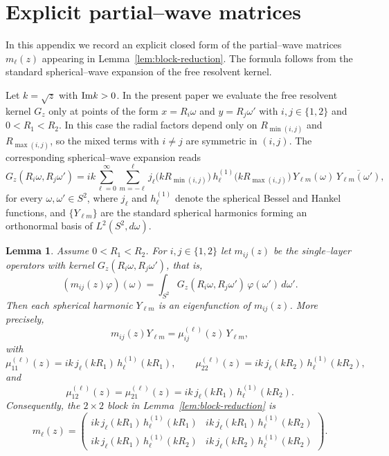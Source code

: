 \documentclass[a4paper,11pt]{article}
\numberwithin{equation}{section}
\renewcommand{\Im}{\text{{\rm Im}}}
\newtheorem{lem}[thm]{Lemma}
\theoremstyle{definition}
\theoremstyle{remark}
\begin{document}
\section{Explicit partial--wave matrices}\label{app:ml}

In this appendix we record an explicit closed form of the partial--wave matrices
$m_\ell(z)$ appearing in Lemma~\ref{lem:block-reduction}.
The formula follows from the standard spherical--wave expansion of the free
resolvent kernel.

Let $k=\sqrt z$ with $\Im k>0$.
In the present paper we evaluate the free resolvent kernel $G_z$ only at points
of the form $x=R_i\omega$ and $y=R_j\omega'$ with $i,j\in\{1,2\}$ and
$0<R_1<R_2$.
In this case the radial factors depend only on $R_{\min(i,j)}$ and
$R_{\max(i,j)}$, so the mixed terms with $i\ne j$ are symmetric in $(i,j)$.
The corresponding spherical--wave expansion reads
$$
G_z(R_i\omega,R_j\omega')
=
ik\sum_{\ell=0}^\infty\sum_{m=-\ell}^{\ell}
j_\ell\bigl(kR_{\min(i,j)}\bigr)\,
h^{(1)}_\ell\bigl(kR_{\max(i,j)}\bigr)\,
Y_{\ell m}(\omega)\,\overline{Y_{\ell m}(\omega')},
$$
for every $\omega,\omega'\in S^2$,
where $j_\ell$ and $h^{(1)}_\ell$ denote the spherical Bessel and Hankel
functions, and $\{Y_{\ell m}\}$ are the standard spherical harmonics forming
an orthonormal basis of $L^2(S^2,d\omega)$.

\begin{lem}\label{lem:ml-formula}
Assume $0<R_1<R_2$.
For $i,j\in\{1,2\}$ let $m_{ij}(z)$ be the single--layer operators with kernel
$G_z(R_i\omega,R_j\omega')$, that is,
$$
(m_{ij}(z)\varphi)(\omega)=\int_{S^2} G_z(R_i\omega,R_j\omega')\,
\varphi(\omega')\,d\omega'.
$$
Then each spherical harmonic $Y_{\ell m}$ is an eigenfunction of $m_{ij}(z)$.
More precisely,
$$
m_{ij}(z)Y_{\ell m} = \mu^{(\ell)}_{ij}(z)\,Y_{\ell m},
$$
with
$$
\mu^{(\ell)}_{11}(z)=ik\,j_\ell(kR_1)\,h^{(1)}_\ell(kR_1),\qquad
\mu^{(\ell)}_{22}(z)=ik\,j_\ell(kR_2)\,h^{(1)}_\ell(kR_2),
$$
and
$$
\mu^{(\ell)}_{12}(z)=\mu^{(\ell)}_{21}(z)
=ik\,j_\ell(kR_1)\,h^{(1)}_\ell(kR_2).
$$
Consequently, the $2\times2$ block in Lemma~\ref{lem:block-reduction} is
$$
m_\ell(z)=
\left(
\begin{array}{cc}
ik\,j_\ell(kR_1)\,h^{(1)}_\ell(kR_1) & ik\,j_\ell(kR_1)\,h^{(1)}_\ell(kR_2)\\
ik\,j_\ell(kR_1)\,h^{(1)}_\ell(kR_2) & ik\,j_\ell(kR_2)\,h^{(1)}_\ell(kR_2)
\end{array}
\right).
$$
\end{lem}
\end{document}
